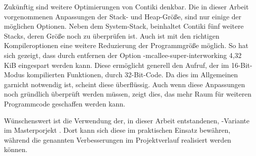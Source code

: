 Zukünftig sind weitere Optimierungen von Contiki denkbar. Die in dieser Arbeit vorgenommenen Anpassungen der Stack- und Heap-Größe,
sind nur einige der möglichen Optionen. Neben dem System-Stack, beinhaltet Contiki fünf weitere Stacks, deren Größe noch zu überprüfen ist.
Auch ist mit den richtigen Kompileroptionen eine weitere Reduzierung der Programmgröße möglich. So hat sich gezeigt, dass durch
entfernen der Option -mcallee-super-interworking 4,32 KiB eingespart werden kann. Diese ermöglicht generell den Aufruf, der im 16-Bit-Modus
kompilierten Funktionen, durch 32-Bit-Code. Da dies im Allgemeinen garnicht notwendig ist, scheint diese überflüssig.
Auch wenn diese Anpassungen noch gründlich überprüft werden müssen, zeigt dies, das mehr Raum für weiteren Programmcode geschaffen werden kann.

Wünschenswert ist die Verwendung der, in dieser Arbeit entstandenen, -Variante im Masterporjekt .
Dort kann sich diese im praktischen Einsatz bewähren, während die genannten Verbesserungen im Projektverlauf realisiert werden können.